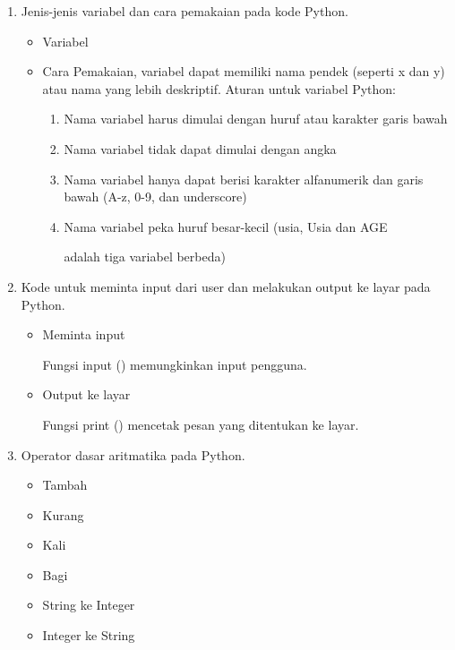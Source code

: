\begin{enumerate}
\item Jenis-jenis variabel dan cara pemakaian pada kode Python.

\begin{itemize}
\item Variabel

\item Cara Pemakaian, variabel dapat memiliki nama pendek (seperti x dan y) atau nama yang lebih deskriptif. Aturan untuk variabel Python:
\par
\begin{enumerate}
\item Nama variabel harus dimulai dengan huruf atau karakter garis bawah
\item Nama variabel tidak dapat dimulai dengan angka
\item Nama variabel hanya dapat berisi karakter alfanumerik dan garis bawah (A-z, 0-9, dan underscore)
\item Nama variabel peka huruf besar-kecil (usia, Usia dan AGE \par adalah tiga variabel berbeda)
\end{enumerate}
\end{itemize}

\item Kode untuk meminta input dari user dan melakukan output ke layar pada Python.
\begin{itemize}
\item Meminta input
\par Fungsi input () memungkinkan input pengguna.

\item Output ke layar
\par Fungsi print () mencetak pesan yang ditentukan ke layar.

\end{itemize}

\item Operator dasar aritmatika pada Python.


\begin{itemize}
\item Tambah

\item Kurang

\item Kali

\item Bagi

\item String ke Integer

\item Integer ke String

\end{itemize}


\end{enumerate}
